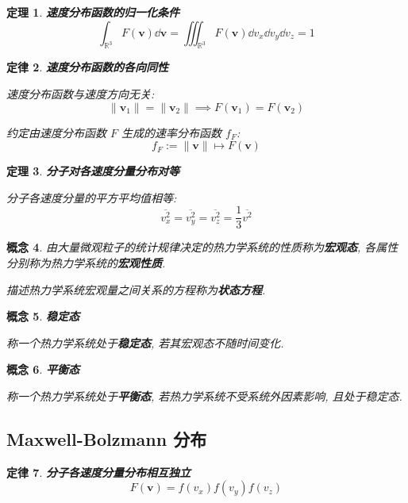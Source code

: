 \documentclass[UTF8]{ctexart}
\DeclareMathOperator{\R}{\mathbb{R}}                    %
\newcommand{\<}{\langle}
\renewcommand{\>}{\rangle}                              %
\newenvironment{dfn_box}{
    \begin{tcolorbox}[enhanced, colback=dfn_green2, boxrule=0pt, frame hidden,
        borderline west={0.7mm}{0.1mm}{dfn_green1},breakable]
    }
    {\end{tcolorbox}}
\newenvironment{axm_box}{
    \begin{tcolorbox}[enhanced, colback=axm_yellow2, boxrule=0pt, frame hidden,
        borderline west={0.7mm}{0.1mm}{axm_yellow1},breakable]
    }
    {\end{tcolorbox}}
\newenvironment{thm_box}{
    \begin{tcolorbox}[enhanced, colback=thm_blue2, boxrule=0pt, frame hidden,
        borderline west={0.7mm}{0.1mm}{thm_blue1},breakable]
    }
    {\end{tcolorbox}}
\theoremstyle{MyStyle} %
\newtheorem{definition}{概念}[subsection]
\newenvironment{cpt}{\begin{dfn_box}\begin{definition}}{\end{definition}\end{dfn_box}}
\newtheorem{axm}[definition]{定律}
\newenvironment{thr}{\begin{axm_box}\begin{axm}}{\end{axm}\end{axm_box}}
\newtheorem{theorem}[definition]{定理}
\newenvironment{thm}{\begin{thm_box}\begin{theorem}}{\end{theorem}\end{thm_box}}
\begin{document}
        \begin{thm}
            \textbf{速度分布函数的归一化条件}
            \[\int_{\R^3}F(\bm{v})\dd\bm{v}=\iiint_{\R^3}F(\bm{v})\dd v_x\dd v_y\dd v_z=1\]
        \end{thm}
        
        \begin{thr}
            \textbf{速度分布函数的各向同性}

            速度分布函数与速度方向无关: 
            \[\|\bm{v}_1\|=\|\bm{v}_2\|\implies F(\bm{v}_1)=F(\bm{v}_2)\]

            约定由速度分布函数 \(F\) 生成的速率分布函数 \(f_F\): 
            \[f_F:=\|\bm{v}\|\mapsto F(\bm{v})\]
        \end{thr}
        
        \begin{thm}
            \textbf{分子对各速度分量分布对等}

            分子各速度分量的平方平均值相等: 
            \[\overline{v_x^2}=\overline{v_y^2}=\overline{v_z^2}=\frac{1}{3}\overline{v^2}\]
        \end{thm}
        
        \begin{cpt}
            由大量微观粒子的统计规律决定的热力学系统的性质称为\textbf{宏观态}, 各属性分别称为热力学系统的\textbf{宏观性质}. 

            描述热力学系统宏观量之间关系的方程称为\textbf{状态方程}. 
        \end{cpt}
        
        \begin{cpt}
            \textbf{稳定态}

            称一个热力学系统处于\textbf{稳定态}, 若其宏观态不随时间变化. 
        \end{cpt}
        
        \begin{cpt}
            \textbf{平衡态}

            称一个热力学系统处于\textbf{平衡态}, 若热力学系统不受系统外因素影响, 且处于稳定态. 
        \end{cpt}

    \subsection{Maxwell-Bolzmann 分布}
        
        \begin{thr}
            \textbf{分子各速度分量分布相互独立}
            \[F(\bm{v})=f(v_x)f(v_y)f(v_z)\]
        \end{thr}
        
\end{document}
